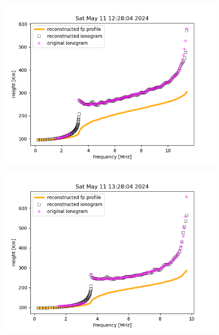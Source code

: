\documentclass[aps,twocolumn,prb,showpacs,superscriptaddress]{revtex4-2}
\newcommand{\+}{\dagger}
\begin{document}
\begin{figure}[htbp]
    \begin{center}
    \includegraphics*[width=0.90\columnwidth]{images/91.png}
    \end{center}
    \caption{}
    \label{fig:04}
\end{figure}

\begin{figure}[htbp]
    \begin{center}
    \includegraphics*[width=0.90\columnwidth]{images/103.png}
    \end{center}
    \caption{}
    \label{fig:05}
\end{figure}
\end{document}
